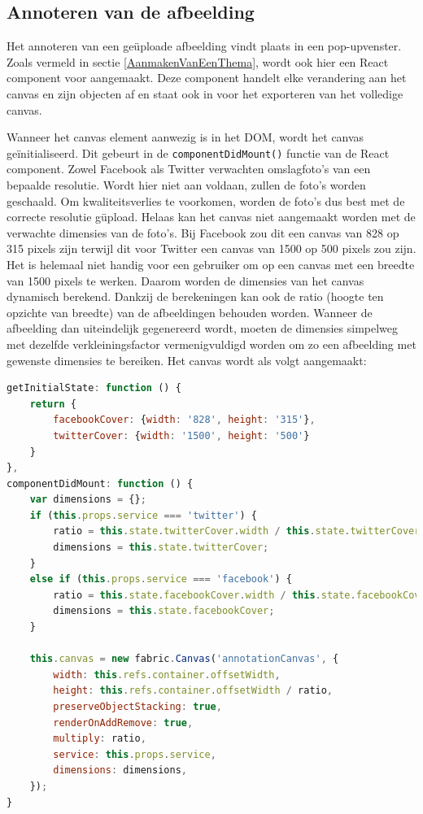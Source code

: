 \subsection{Annoteren van de afbeelding}\label{AnnoterenVanAfbeelding}
Het annoteren van een ge\"{u}ploade afbeelding vindt plaats in een  pop-upvenster. Zoals vermeld in sectie \ref{AanmakenVanEenThema}, wordt ook hier een React component voor aangemaakt. Deze component handelt elke verandering aan het canvas en zijn objecten af en staat ook in voor het exporteren van het volledige canvas. 

Wanneer het canvas element aanwezig is in het DOM, wordt het canvas ge\"{i}nitialiseerd. Dit gebeurt in de \texttt{componentDidMount()} functie van de React component. Zowel Facebook als Twitter verwachten omslagfoto's van een bepaalde resolutie. Wordt hier niet aan voldaan, zullen de foto's worden geschaald. Om kwaliteitsverlies te voorkomen, worden de foto's dus best met de correcte resolutie g\"{u}pload. Helaas kan het canvas niet aangemaakt worden met de verwachte dimensies van de foto's. Bij Facebook zou dit een canvas van 828 op 315 pixels zijn terwijl dit voor Twitter een canvas van 1500 op 500 pixels zou zijn. Het is helemaal niet handig voor een gebruiker om op een canvas met een breedte van 1500 pixels te werken. Daarom worden de dimensies van het canvas dynamisch berekend. Dankzij de berekeningen kan ook de ratio (hoogte ten opzichte van breedte) van de afbeeldingen behouden worden. Wanneer de afbeelding dan uiteindelijk gegenereerd wordt, moeten de dimensies simpelweg met dezelfde verkleiningsfactor vermenigvuldigd worden om zo een afbeelding met gewenste dimensies te bereiken. Het canvas wordt als volgt aangemaakt:

\begin{lstlisting}[language=javascript]
getInitialState: function () {
	return {
		facebookCover: {width: '828', height: '315'},
		twitterCover: {width: '1500', height: '500'}
	}
},
componentDidMount: function () {
	var dimensions = {};
	if (this.props.service === 'twitter') {
		ratio = this.state.twitterCover.width / this.state.twitterCover.height;
		dimensions = this.state.twitterCover;
	}
	else if (this.props.service === 'facebook') {
		ratio = this.state.facebookCover.width / this.state.facebookCover.height;
		dimensions = this.state.facebookCover;
	}
		
	this.canvas = new fabric.Canvas('annotationCanvas', {
		width: this.refs.container.offsetWidth,
		height: this.refs.container.offsetWidth / ratio,
		preserveObjectStacking: true,
		renderOnAddRemove: true,
		multiply: ratio,
		service: this.props.service,
		dimensions: dimensions,
	});
}
\end{lstlisting}

